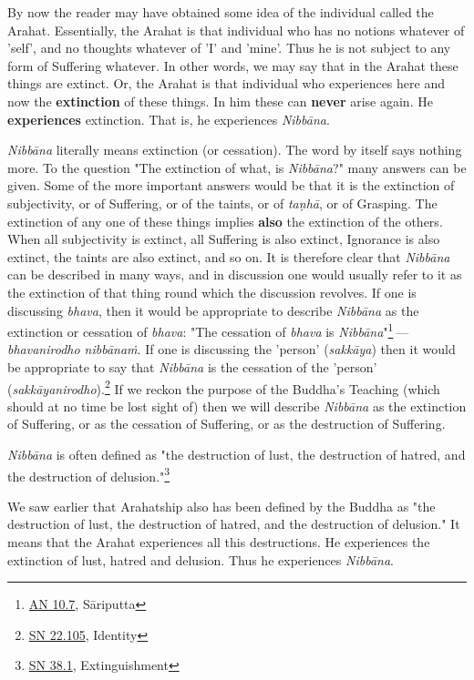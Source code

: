 By now the reader may have obtained some idea of the individual called the Arahat. Essentially, the Arahat is that individual who has no notions whatever of 'self', and no thoughts whatever of 'I' and 'mine'. Thus he is not subject to any form of Suffering whatever. In other words, we may say that in the Arahat these things are extinct. Or, the Arahat is that individual who experiences here and now the \textbf{extinction} of these things. In him these can \textbf{never} arise again. He \textbf{experiences} extinction. That is, he experiences \emph{Nibbāna}.

\emph{Nibbāna} literally means extinction (or cessation). The word by itself says nothing more. To the question "The extinction of what, is \emph{Nibbāna}?" many answers can be given. Some of the more important answers would be that it is the extinction of subjectivity, or of Suffering, or of the taints, or of \emph{taṇhā}, or of Grasping. The extinction of any one of these things implies \textbf{also} the extinction of the others. When all subjectivity is extinct, all Suffering is also extinct, Ignorance is also extinct, the taints are also extinct, and so on. It is therefore clear that \emph{Nibbāna} can be described in many ways, and in discussion one would usually refer to it as the extinction of that thing round which the discussion revolves. If one is discussing \emph{bhava}, then it would be appropriate to describe \emph{Nibbāna} as the extinction or cessation of \emph{bhava}: "The cessation of \emph{bhava} is \emph{Nibbāna}"\footnote{\href{https://suttacentral.net/an10.7/en/bodhi}{AN 10.7}, Sāriputta} --- \emph{bhavanirodho nibbānaṁ}. If one is discussing the 'person' (\emph{sakkāya}) then it would be appropriate to say that \emph{Nibbāna} is the cessation of the 'person' (\emph{sakkāyanirodho}).\footnote{\href{https://suttacentral.net/sn22.105/en/sujato}{SN 22.105}, Identity} If we reckon the purpose of the Buddha's Teaching (which should at no time be lost sight of) then we will describe \emph{Nibbāna} as the extinction of Suffering, or as the cessation of Suffering, or as the destruction of Suffering.

\emph{Nibbāna} is often defined as "the destruction of lust, the destruction of hatred, and the destruction of delusion."\footnote{\href{https://suttacentral.net/sn38.1/en/sujato}{SN 38.1}, Extinguishment}

We saw earlier that Arahatship also has been defined by the Buddha as "the destruction of lust, the destruction of hatred, and the destruction of delusion." It means that the Arahat experiences all this destructions. He experiences the extinction of lust, hatred and delusion. Thus he experiences \emph{Nibbāna}.

